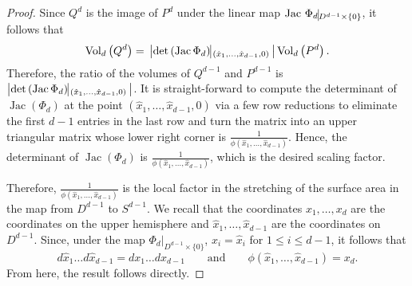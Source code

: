 \documentclass[twoside,11pt]{article}
\newcommand{\VV}[2]{\text{Vol}_{#2}\left( #1 \right)}
\DeclareMathOperator{\Jac}{Jac}
\begin{document}
\begin{proof}
			Since $Q^d$ is the image of $P^d$ under the linear map $\Jac \, \Phi_d \vline_{D^{d-1} \times \{0\}}$, it follows that 		 \begin{equation*} 
				\VV{Q^d}{d} = \, \left\vert \det \left(\Jac \Phi_d \right)\vline_{\left(\hat{x}_1, \ldots, \hat{x}_{d-1}, 0 \right)} \, \right\vert  \VV{P^d}{d}.
				\end{equation*}
				Therefore, the ratio of the volumes of $Q^{d-1}$ and $P^{d-1}$ is $\left| \det \left(\Jac \Phi_d \right)\vline_{\left(\hat{x}_1, \ldots, \hat{x}_{d-1}, 0 \right)} \, \right|$.
				It is straight-forward to compute the determinant of $\Jac(\Phi_d)$ at the point  $\left( \hat{x}_1, \ldots,\hat{x}_{d-1}, 0\right)$ via a few row reductions to eliminate the first $d-1$ entries in the last row and turn the matrix into an upper triangular matrix whose lower right corner is $\frac{1}{\phi(\hat{x}_1, \ldots, \hat{x}_{d-1})}$.
				Hence, the determinant of 
			$\Jac(\Phi_d)$ is $\frac{1}{\phi(\hat{x}_1, \ldots, \hat{x}_{d-1})}$, which is the desired scaling factor.

			Therefore, $\frac{1}{\phi(\hat{x}_1, \ldots, \hat{x}_{d-1})}$ is the local factor in the stretching of the surface area in the map from $D^{d-1}$ to $S^{d-1}$.  
			We recall that the coordinates $x_1,\dots,x_d$ are the coordinates on the upper hemisphere and $\hat{x}_1,\dots,\hat{x}_{d-1}$ are the coordinates on $D^{d-1}$.
			 Since, under the map $\Phi_d|_{D^{d-1}\times\{0\}}$, $x_i=\hat{x}_i$ for $1\leq i\leq d-1$, it follows that
			$$
			d\hat{x}_1\dots d\hat{x}_{d-1}=dx_1\dots dx_{d-1}\qquad\text{and}\qquad \phi(\hat{x}_1,\dots,\hat{x}_{d-1})=x_d.
			$$
			From here, the result follows directly.		
		\end{proof}	
\end{document}
